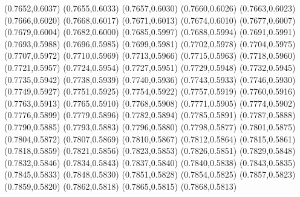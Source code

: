 \PST@Filltriangle(0.7652,0.6037)
\PST@Filltriangle(0.7655,0.6033)
\PST@Filltriangle(0.7657,0.6030)
\PST@Filltriangle(0.7660,0.6026)
\PST@Filltriangle(0.7663,0.6023)
\PST@Filltriangle(0.7666,0.6020)
\PST@Filltriangle(0.7668,0.6017)
\PST@Filltriangle(0.7671,0.6013)
\PST@Filltriangle(0.7674,0.6010)
\PST@Filltriangle(0.7677,0.6007)
\PST@Filltriangle(0.7679,0.6004)
\PST@Filltriangle(0.7682,0.6000)
\PST@Filltriangle(0.7685,0.5997)
\PST@Filltriangle(0.7688,0.5994)
\PST@Filltriangle(0.7691,0.5991)
\PST@Filltriangle(0.7693,0.5988)
\PST@Filltriangle(0.7696,0.5985)
\PST@Filltriangle(0.7699,0.5981)
\PST@Filltriangle(0.7702,0.5978)
\PST@Filltriangle(0.7704,0.5975)
\PST@Filltriangle(0.7707,0.5972)
\PST@Filltriangle(0.7710,0.5969)
\PST@Filltriangle(0.7713,0.5966)
\PST@Filltriangle(0.7715,0.5963)
\PST@Filltriangle(0.7718,0.5960)
\PST@Filltriangle(0.7721,0.5957)
\PST@Filltriangle(0.7724,0.5954)
\PST@Filltriangle(0.7727,0.5951)
\PST@Filltriangle(0.7729,0.5948)
\PST@Filltriangle(0.7732,0.5945)
\PST@Filltriangle(0.7735,0.5942)
\PST@Filltriangle(0.7738,0.5939)
\PST@Filltriangle(0.7740,0.5936)
\PST@Filltriangle(0.7743,0.5933)
\PST@Filltriangle(0.7746,0.5930)
\PST@Filltriangle(0.7749,0.5927)
\PST@Filltriangle(0.7751,0.5925)
\PST@Filltriangle(0.7754,0.5922)
\PST@Filltriangle(0.7757,0.5919)
\PST@Filltriangle(0.7760,0.5916)
\PST@Filltriangle(0.7763,0.5913)
\PST@Filltriangle(0.7765,0.5910)
\PST@Filltriangle(0.7768,0.5908)
\PST@Filltriangle(0.7771,0.5905)
\PST@Filltriangle(0.7774,0.5902)
\PST@Filltriangle(0.7776,0.5899)
\PST@Filltriangle(0.7779,0.5896)
\PST@Filltriangle(0.7782,0.5894)
\PST@Filltriangle(0.7785,0.5891)
\PST@Filltriangle(0.7787,0.5888)
\PST@Filltriangle(0.7790,0.5885)
\PST@Filltriangle(0.7793,0.5883)
\PST@Filltriangle(0.7796,0.5880)
\PST@Filltriangle(0.7798,0.5877)
\PST@Filltriangle(0.7801,0.5875)
\PST@Filltriangle(0.7804,0.5872)
\PST@Filltriangle(0.7807,0.5869)
\PST@Filltriangle(0.7810,0.5867)
\PST@Filltriangle(0.7812,0.5864)
\PST@Filltriangle(0.7815,0.5861)
\PST@Filltriangle(0.7818,0.5859)
\PST@Filltriangle(0.7821,0.5856)
\PST@Filltriangle(0.7823,0.5853)
\PST@Filltriangle(0.7826,0.5851)
\PST@Filltriangle(0.7829,0.5848)
\PST@Filltriangle(0.7832,0.5846)
\PST@Filltriangle(0.7834,0.5843)
\PST@Filltriangle(0.7837,0.5840)
\PST@Filltriangle(0.7840,0.5838)
\PST@Filltriangle(0.7843,0.5835)
\PST@Filltriangle(0.7845,0.5833)
\PST@Filltriangle(0.7848,0.5830)
\PST@Filltriangle(0.7851,0.5828)
\PST@Filltriangle(0.7854,0.5825)
\PST@Filltriangle(0.7857,0.5823)
\PST@Filltriangle(0.7859,0.5820)
\PST@Filltriangle(0.7862,0.5818)
\PST@Filltriangle(0.7865,0.5815)
\PST@Filltriangle(0.7868,0.5813)
